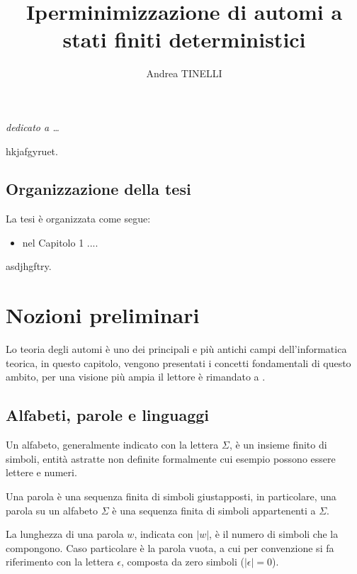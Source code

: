\documentclass[a4paper,12pt]{report}
\begin{document}
\title{Iperminimizzazione di automi a stati finiti deterministici}
\author{Andrea TINELLI}



\beforepreface
\prefacesection{}
{\hfill \Large {\sl dedicato a \dots}}



% 
%
hkjafgyruet.
%
%
\section*{Organizzazione della tesi}
\label{organizzazione}
La tesi \`e organizzata come segue:
\begin{itemize}
\item nel Capitolo 1 ....
\end{itemize}
%
%
asdjhgftry.
\afterpreface
% 
% 
\chapter{Nozioni preliminari}
\label{cap1}

Lo teoria degli automi è uno dei principali e più antichi campi dell'informatica teorica, in questo capitolo, vengono presentati i concetti fondamentali di questo ambito, per una visione più ampia il lettore è rimandato a \cite{HMU06}.

\section{Alfabeti, parole e linguaggi}

Un alfabeto, generalmente indicato con la lettera $\Sigma$, è un insieme finito di simboli, entità astratte non definite formalmente cui esempio possono essere lettere e numeri.

Una parola è una sequenza finita di simboli giustapposti, in particolare, una parola su un alfabeto $\Sigma$ è una sequenza finita di simboli appartenenti a $\Sigma$.

La lunghezza di una parola $w$, indicata con $|w|$, è il numero di simboli che la compongono.
Caso particolare è la parola vuota, a cui per convenzione si fa riferimento con la lettera $\epsilon$, composta da zero simboli ($|\epsilon| = 0$).
\end{document}
